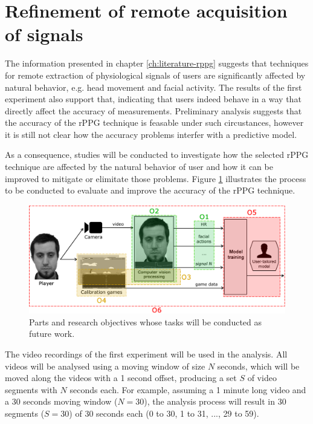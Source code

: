 \section{Refinement of remote acquisition of signals}

The information presented in chapter \ref{ch:literature-rppg} suggests that techniques for remote extraction of physiological signals of users are significantly affected by natural behavior, e.g. head movement and facial activity. The results of the first experiment also support that, indicating that users indeed behave in a way that directly affect the accuracy of measurements. Preliminary analysis \parencite{bevilacqua2017accuracy} suggests that the accuracy of the rPPG technique is feasable under such circustances, however it is still not clear how the accuracy problems interfer with a predictive model.

As a consequence, studies will be conducted to investigate how the selected rPPG technique are affected by the natural behavior of user and how it can be improved to mitigate or elimitate those problems. Figure \ref{fig:rppg-accuracy-study} illustrates the process to be conducted to evaluate and improve the accuracy of the rPPG technique.

\begin{figure}[h]
    \centering
    \includegraphics[width=\textwidth]{figures/components-objectives.png}
    \caption{Parts and research objectives whose tasks will be conducted as future work.}
    \label{fig:rppg-accuracy-study}
\end{figure}

The video recordings of the first experiment will be used in the analysis. All videos will be analysed using a moving window of size $N$ seconds, which will be moved along the videos with a 1 second offset, producing a set $S$ of video segments with $N$ seconds each. For example, assuming a 1 minute long video and a 30 seconds moving window ($N=30$), the analysis process will result in 30 segments ($S=30$) of 30 seconds each (0 to 30, 1 to 31, ..., 29 to 59).

